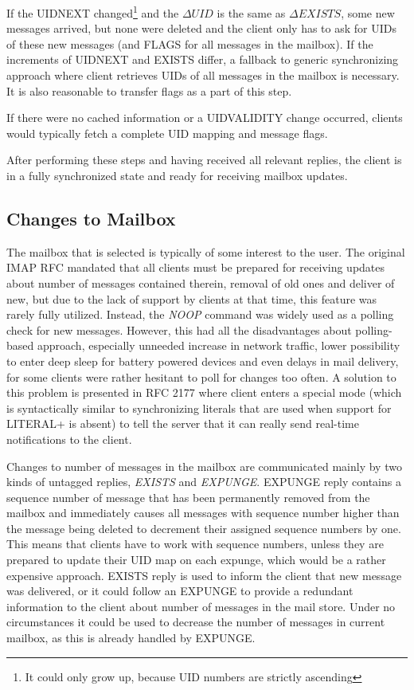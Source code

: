 \documentclass[12pt,notitlepage]{report}
\begin{document}
If the UIDNEXT changed\footnote{It could only grow up, because UID numbers are
strictly ascending} and the $\Delta UID$ is the same as $\Delta EXISTS$, some
new messages arrived, but none were deleted and the client only has to ask for
UIDs of these new messages (and FLAGS for all messages in the mailbox).  If the
increments of UIDNEXT and EXISTS differ, a fallback to generic
synchronizing approach where client retrieves UIDs of all messages in the mailbox is
necessary.  It is also reasonable to transfer flags as a part of this step.

If there were no cached information or a UIDVALIDITY change occurred, clients
would typically fetch a complete UID mapping and message flags.

After performing these steps and having received all relevant replies, the
client is in a fully synchronized state and ready for receiving mailbox updates.

\subsection{Changes to Mailbox}

The mailbox that is selected is typically of some interest to the user.  The
original IMAP RFC mandated that all clients must be prepared for receiving
updates about number of messages contained therein, removal of old ones and
deliver of new, but due to the lack of support by clients at that time, this feature
was rarely fully utilized.  Instead, the {\em NOOP} command was widely used as a
polling check for new messages.  However, this had all the disadvantages about
polling-based approach, especially unneeded increase in network traffic, lower
possibility to enter deep sleep for battery powered devices and even delays in
mail delivery, for some clients were rather hesitant to poll for changes too
often.  A solution to this problem is presented in RFC 2177 \cite{rfc-idle}
where client enters a special mode (which is syntactically similar to
synchronizing literals that are used when support for LITERAL+
\cite{rfc-literalplus} is absent) to tell the server that it can really send
real-time notifications to the client.

Changes to number of messages in the mailbox are communicated mainly by two
kinds of untagged replies, {\em EXISTS} and {\em EXPUNGE}.  EXPUNGE reply
contains a sequence number of message that has been permanently removed from the
mailbox and immediately causes all messages with sequence number higher than
the message being deleted to decrement their assigned sequence numbers by one.
This means that clients have to work with sequence numbers, unless they are
prepared to update their UID map on each expunge, which would be a rather
expensive approach.  EXISTS reply is used to inform the client that new message
was delivered, or it could follow an EXPUNGE to provide a redundant information
to the client about number of messages in the mail store.  Under no
circumstances it could be used to decrease the number of messages in current
mailbox, as this is already handled by EXPUNGE.
\end{document}
